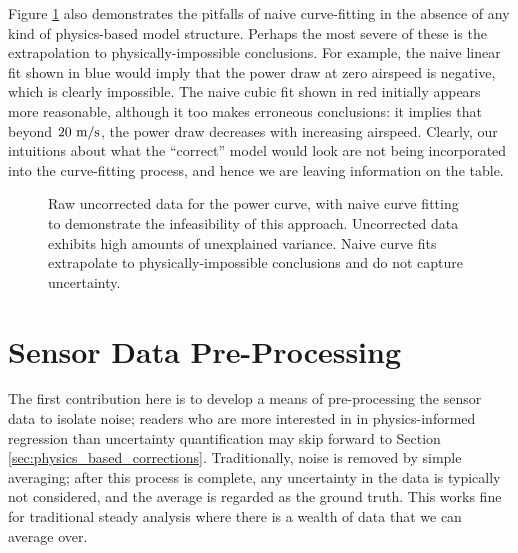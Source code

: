 Figure \ref{fig:power_curve_naive} also demonstrates the pitfalls of naive curve-fitting in the absence of any kind of physics-based model structure. Perhaps the most severe of these is the extrapolation to physically-impossible conclusions. For example, the naive linear fit shown in blue would imply that the power draw at zero airspeed is negative, which is clearly impossible. The naive cubic fit shown in red initially appears more reasonable, although it too makes erroneous conclusions: it implies that beyond $20\ \rm m/s$, the power draw decreases with increasing airspeed. Clearly, our intuitions about what the ``correct'' model would look are not being incorporated into the curve-fitting process, and hence we are leaving information on the table.

\begin{figure}[H]
    \centering
    \caption{Raw uncorrected data for the power curve, with naive curve fitting to demonstrate the infeasibility of this approach. Uncorrected data exhibits high amounts of unexplained variance. Naive curve fits extrapolate to physically-impossible conclusions and do not capture uncertainty.}
    \label{fig:power_curve_naive}
\end{figure}


\section{Sensor Data Pre-Processing}

The first contribution here is to develop a means of pre-processing the sensor data to isolate noise; readers who are more interested in in physics-informed regression than uncertainty quantification may skip forward to Section \ref{sec:physics_based_corrections}. Traditionally, noise is removed by simple averaging; after this process is complete, any uncertainty in the data is typically not considered, and the average is regarded as the ground truth. This works fine for traditional steady analysis where there is a wealth of data that we can average over.

